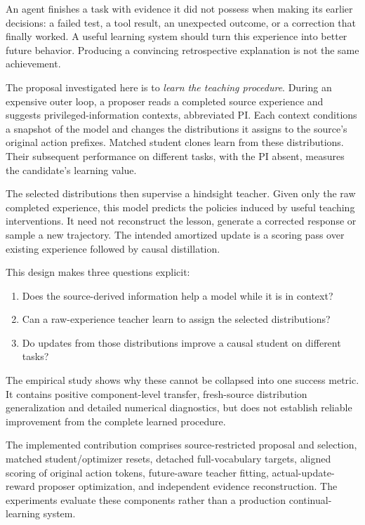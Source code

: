 \documentclass[11pt,letterpaper]{article}
\begin{document}
An agent finishes a task with evidence it did not possess when making its earlier decisions: a failed test, a tool result, an unexpected outcome, or a correction that finally worked. A useful learning system should turn this experience into better future behavior. Producing a convincing retrospective explanation is not the same achievement.

The proposal investigated here is to \emph{learn the teaching procedure}. During an expensive outer loop, a proposer reads a completed source experience and suggests privileged-information contexts, abbreviated PI. Each context conditions a snapshot of the model and changes the distributions it assigns to the source's original action prefixes. Matched student clones learn from these distributions. Their subsequent performance on different tasks, with the PI absent, measures the candidate's learning value.

The selected distributions then supervise a hindsight teacher. Given only the raw completed experience, this model predicts the policies induced by useful teaching interventions. It need not reconstruct the lesson, generate a corrected response or sample a new trajectory. The intended amortized update is a scoring pass over existing experience followed by causal distillation.

This design makes three questions explicit:
\begin{enumerate}
\item Does the source-derived information help a model while it is in context?
\item Can a raw-experience teacher learn to assign the selected distributions?
\item Do updates from those distributions improve a causal student on different tasks?
\end{enumerate}
The empirical study shows why these cannot be collapsed into one success metric. It contains positive component-level transfer, fresh-source distribution generalization and detailed numerical diagnostics, but does not establish reliable improvement from the complete learned procedure.

The implemented contribution comprises source-restricted proposal and selection, matched student/optimizer resets, detached full-vocabulary targets, aligned scoring of original action tokens, future-aware teacher fitting, actual-update-reward proposer optimization, and independent evidence reconstruction. The experiments evaluate these components rather than a production continual-learning system.
\end{document}
